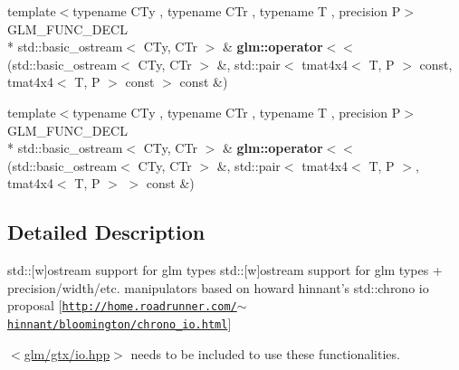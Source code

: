 \begin{DoxyCompactItemize}
\item 
\hypertarget{group__gtx__io_ga112ff562e10c18929151d17e711e27a7}{{\footnotesize template$<$typename C\-Ty , typename C\-Tr , typename T , precision P$>$ }\\G\-L\-M\-\_\-\-F\-U\-N\-C\-\_\-\-D\-E\-C\-L \\*
std\-::basic\-\_\-ostream$<$ C\-Ty, C\-Tr $>$ \& {\bfseries glm\-::operator$<$$<$} (std\-::basic\-\_\-ostream$<$ C\-Ty, C\-Tr $>$ \&, std\-::pair$<$ tmat4x4$<$ T, P $>$ const, tmat4x4$<$ T, P $>$ const  $>$ const \&)}\label{group__gtx__io_ga112ff562e10c18929151d17e711e27a7}

\item 
\hypertarget{group__gtx__io_gad09c7114641975d778243bd4379a3ea5}{{\footnotesize template$<$typename C\-Ty , typename C\-Tr , typename T , precision P$>$ }\\G\-L\-M\-\_\-\-F\-U\-N\-C\-\_\-\-D\-E\-C\-L \\*
std\-::basic\-\_\-ostream$<$ C\-Ty, C\-Tr $>$ \& {\bfseries glm\-::operator$<$$<$} (std\-::basic\-\_\-ostream$<$ C\-Ty, C\-Tr $>$ \&, std\-::pair$<$ tmat4x4$<$ T, P $>$, tmat4x4$<$ T, P $>$ $>$ const \&)}\label{group__gtx__io_gad09c7114641975d778243bd4379a3ea5}

\end{DoxyCompactItemize}


\subsection{Detailed Description}
std\-:\-:\mbox{[}w\mbox{]}ostream support for glm types std\-:\-:\mbox{[}w\mbox{]}ostream support for glm types + precision/width/etc. manipulators based on howard hinnant's std\-::chrono io proposal \mbox{[}\href{http://home.roadrunner.com/~hinnant/bloomington/chrono_io.html}{\tt http\-://home.\-roadrunner.\-com/$\sim$hinnant/bloomington/chrono\-\_\-io.\-html}\mbox{]}

$<$\hyperlink{io_8hpp}{glm/gtx/io.\-hpp}$>$ needs to be included to use these functionalities. 